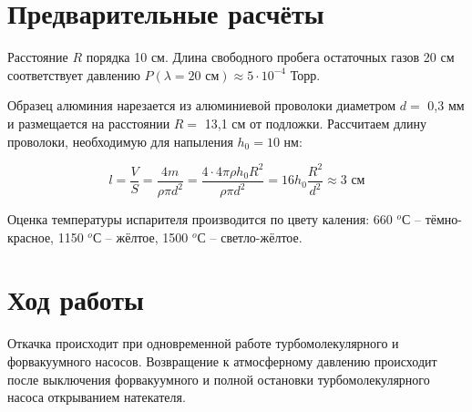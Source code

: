 \documentclass[a4paper, 14pt]{extarticle}
\begin{document}
		
	\section{Предварительные расчёты} 
	
		\hspace{5mm} Расстояние $R$ порядка 10 см. Длина свободного пробега остаточных газов 20 см соответствует давлению $P(\lambda = 20 \text{ см}) \approx 5 \cdot 10^{-4}$ Торр.
		
		Образец алюминия нарезается из алюминиевой проволоки диаметром $d =$ 0,3 мм и размещается на расстоянии $R =$ 13,1 см от подложки. Рассчитаем длину проволоки, необходимую для напыления $h_0 = 10$ нм:
		
		\begin{equation}
			l = \frac{V}{S} = \dfrac{4m}{\rho\pi d^2} = \frac{4 \cdot 4\pi\rho h_0 R^2}{\rho \pi d^2} = 16 h_0 \frac{R^2}{d^2} \approx 3 \text{ см}
		\end{equation}
		
		Оценка температуры испарителя производится по цвету каления: 660 $^o$С -- тёмно-красное, 1150 $^o$С -- жёлтое, 1500 $^o$С -- светло-жёлтое.
		
		
	\section{Ход работы}
	
		Откачка происходит при одновременной работе турбомолекулярного и форвакуумного насосов. Возвращение к атмосферному давлению происходит после выключения форвакуумного и полной остановки турбомолекулярного насоса открыванием натекателя. 
	
\end{document}
